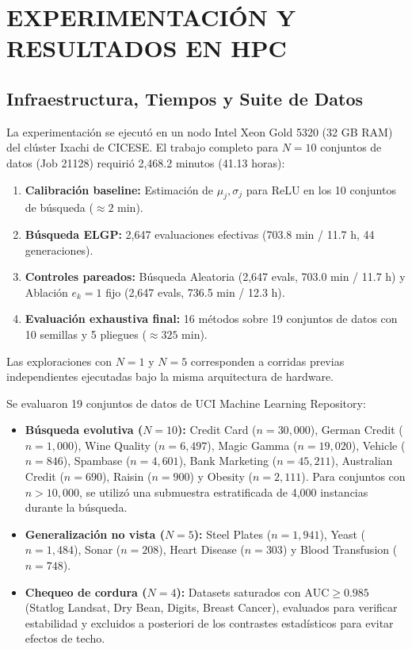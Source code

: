 \documentclass[10pt,twocolumn,letterpaper]{article}
\newcommand{\AUC}{\mathrm{AUC}}
\begin{document}
\section{EXPERIMENTACIÓN Y RESULTADOS EN HPC}

\subsection{Infraestructura, Tiempos y Suite de Datos}
La experimentación se ejecutó en un nodo Intel Xeon Gold 5320 (32 GB RAM) del clúster Ixachi de CICESE. El trabajo completo para $N=10$ conjuntos de datos (Job 21128) requirió 2{,}468.2 minutos (41.13 horas):
\begin{enumerate}[leftmargin=1.2em]
  \item \textbf{Calibración baseline:} Estimación de $\mu_j, \sigma_j$ para ReLU en los 10 conjuntos de búsqueda ($\approx 2$ min).
  \item \textbf{Búsqueda ELGP:} 2{,}647 evaluaciones efectivas (703.8 min / 11.7 h, 44 generaciones).
  \item \textbf{Controles pareados:} Búsqueda Aleatoria (2{,}647 evals, 703.0 min / 11.7 h) y Ablación $e_k=1$ fijo (2{,}647 evals, 736.5 min / 12.3 h).
  \item \textbf{Evaluación exhaustiva final:} 16 métodos sobre 19 conjuntos de datos con 10 semillas y 5 pliegues ($\approx 325$ min).
\end{enumerate}

Las exploraciones con $N=1$ y $N=5$ corresponden a corridas previas independientes ejecutadas bajo la misma arquitectura de hardware.

Se evaluaron 19 conjuntos de datos de UCI Machine Learning Repository:
\begin{itemize}[leftmargin=1.2em]
  \item \textbf{Búsqueda evolutiva ($N=10$):} Credit Card ($n=30{,}000$), German Credit ($n=1{,}000$), Wine Quality ($n=6{,}497$), Magic Gamma ($n=19{,}020$), Vehicle ($n=846$), Spambase ($n=4{,}601$), Bank Marketing ($n=45{,}211$), Australian Credit ($n=690$), Raisin ($n=900$) y Obesity ($n=2{,}111$). Para conjuntos con $n > 10{,}000$, se utilizó una submuestra estratificada de 4{,}000 instancias durante la búsqueda.
  \item \textbf{Generalización no vista ($N=5$):} Steel Plates ($n=1{,}941$), Yeast ($n=1{,}484$), Sonar ($n=208$), Heart Disease ($n=303$) y Blood Transfusion ($n=748$).
  \item \textbf{Chequeo de cordura ($N=4$):} Datasets saturados con $\AUC \ge 0.985$ (Statlog Landsat, Dry Bean, Digits, Breast Cancer), evaluados para verificar estabilidad y excluidos a posteriori de los contrastes estadísticos para evitar efectos de techo.
\end{itemize}
\end{document}
